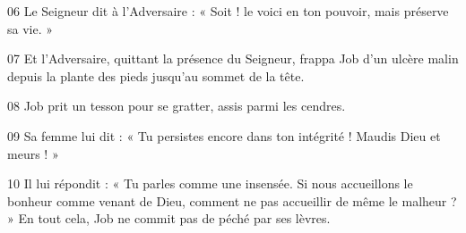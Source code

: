 
06 Le Seigneur dit à l’Adversaire : « Soit ! le voici en ton pouvoir, mais préserve sa vie. »

07 Et l’Adversaire, quittant la présence du Seigneur, frappa Job d’un ulcère malin depuis la plante des pieds jusqu’au sommet de la tête.

08 Job prit un tesson pour se gratter, assis parmi les cendres.

09 Sa femme lui dit : « Tu persistes encore dans ton intégrité ! Maudis Dieu et meurs ! »

10 Il lui répondit : « Tu parles comme une insensée. Si nous accueillons le bonheur comme venant de Dieu, comment ne pas accueillir de même le malheur ? » En tout cela, Job ne commit pas de péché par ses lèvres.
